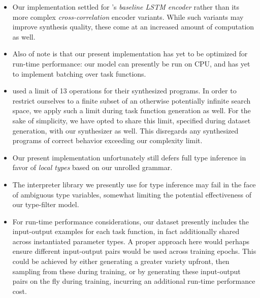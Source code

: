 \documentclass{article}
\begin{document}
\begin{itemize}
    \item
    Our implementation settled for \citet{nsps}'s \emph{baseline LSTM encoder} rather than its more complex \emph{cross-correlation} encoder variants.
    While such variants may improve synthesis quality,
    these come at an increased amount of computation as well.

    \item
    Also of note is that our present implementation has yet to be optimized for run-time performance:
    our model can presently be run on CPU,
    and has yet to implement batching over task functions.

    \item
    \citet{nsps} used a limit of 13 operations for their synthesized programs.
    In order to restrict ourselves to a finite subset of an otherwise potentially infinite search space,
    we apply such a limit during task function generation as well.
    For the sake of simplicity, we have opted to share this limit,
    specified during dataset generation, with our synthesizer as well.
    This disregards any synthesized programs of
    correct behavior exceeding our complexity limit.


    \item
    Our present implementation unfortunately still defers full type inference in favor of \emph{local types} based on our unrolled grammar.

    \item
    The interpreter library we presently use for type inference may fail in the face of ambiguous type variables,
    somewhat limiting the potential effectiveness of our type-filter model.

    \item
    For run-time performance considerations,
    our dataset presently includes the input-output examples for each task function,
    in fact additionally shared across instantiated parameter types.
    A proper approach here would perhaps ensure different input-output pairs would be used across training epochs.
    This could be achieved by either generating a greater variety upfront,
    then sampling from these during training, or by generating these input-output pairs on the fly during training,
    incurring an additional run-time performance cost.


\end{itemize}
\end{document}
